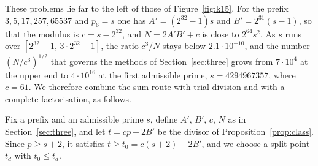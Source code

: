 \documentclass[11pt,reqno]{amsart}
\numberwithin{equation}{section}
\theoremstyle{plain}
\theoremstyle{definition}
\theoremstyle{remark}
\begin{document}
These problems lie far to the left of those of Figure~\ref{fig:k15}.
For the prefix $3,5,17,257,65537$ and $p_6=s$ one has
$A'=(2^{32}-1)s$ and $B'=2^{31}(s-1)$, so that the modulus is
$c=s-2^{32}$, and $N=2A'B'+c$ is close to $2^{64}s^2$. As $s$ runs
over $[2^{32}+1,\,3\cdot2^{32}-1]$, the ratio $c^3/N$ stays below
$2.1\cdot10^{-10}$, and the number $(N/c^3)^{1/2}$ that governs the
methods of Section~\ref{sec:three} grows from $7\cdot10^4$ at the
upper end to $4\cdot10^{16}$ at the first admissible prime,
$s=4294967357$, where $c=61$. We therefore combine the sum route with
trial division and with a complete factorisation, as follows.

Fix a prefix and an admissible prime $s$, define $A'$, $B'$, $c$, $N$
as in Section~\ref{sec:three}, and let $t=cp-2B'$ be the divisor of
Proposition~\ref{prop:class}. Since $p\ge s+2$, it satisfies
$t\ge t_0=c(s+2)-2B'$, and we choose a split point $t_d$ with
$t_0\le t_d$.
\end{document}
